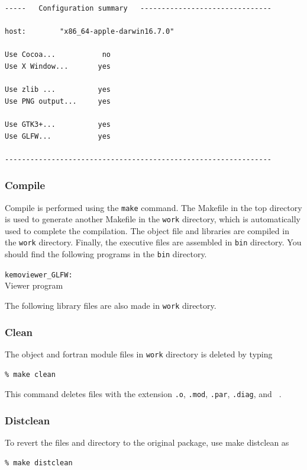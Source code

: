{\small
\begin{verbatim}
-----   Configuration summary   -------------------------------

host:        "x86_64-apple-darwin16.7.0"

Use Cocoa...           no
Use X Window...       yes

Use zlib ...          yes
Use PNG output...     yes

Use GTK3+...          yes
Use GLFW...           yes

---------------------------------------------------------------
\end{verbatim}
}


\subsubsection{Compile}
Compile is performed using the {\tt make} command. The Makefile in the top directory is used to generate another Makefile in the {\tt work} directory, which is automatically used to complete the compilation. The object file and libraries are compiled in the {\tt work} directory. Finally, the executive files are assembled in {\tt bin} directory. You should find the following programs in the {\tt bin} directory.
%
\begin{description}
\item{\tt kemoviewer\_GLFW:    }\\
 Viewer program
\end{description}
%
The following library files are also made in {\tt work} directory.
%
%

\subsubsection{Clean}
The object and fortran module files in {\tt work} directory is deleted by typing
\begin{verbatim}
% make clean
\end{verbatim}
This command deletes files with the extension {\tt .o}, {\tt .mod}, {\tt .par}, {\tt .diag}, and {\tt ~}.

\subsubsection{Distclean}
To revert the files and directory to the original package, use make distclean as
\begin{verbatim}
% make distclean
\end{verbatim}


